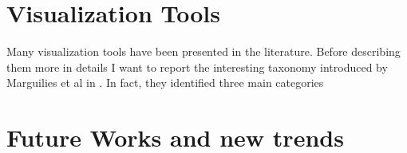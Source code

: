 \documentclass{article}
\begin{document}
\begin{multicols}{2}
\section{Visualization Tools}
Many visualization tools have been presented in the literature. Before describing them more in details I want to report the interesting taxonomy introduced by Marguilies et al in \cite{visualizingHumanConnectome}. In fact, they identified three main categories 

\section{Future Works and new trends}


{}
  





\end{multicols}
\end{document}
